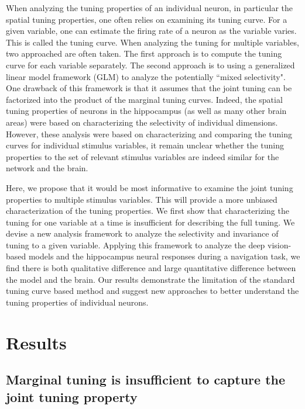 \documentclass[11pt]{article}
\begin{document}
When analyzing the tuning properties of an individual neuron, in particular the spatial tuning properties, one often relies on examining its tuning curve. For a given variable, one can estimate the firing rate of a neuron as the variable varies. This is called the tuning curve. When analyzing the tuning for multiple variables, two approached are often taken. The first approach is to compute the tuning curve for each variable separately. 
The second approach is to using a generalized linear model framework (GLM) to analyze the potentially ``mixed selectivity". One drawback of this framework is that it assumes that the joint tuning can be factorized into the product of the marginal tuning curves. Indeed, the spatial tuning properties of neurons in the hippocampus (as well as many other brain areas) were based on characterizing the selectivity of individual dimensions. However, these analysis were based on characterizing and comparing the tuning curves for individual stimulus variables, it remain unclear whether the tuning properties to the set of relevant stimulus variables are indeed similar for the network and the brain.


Here, we propose that it would be most informative to examine the joint tuning properties to multiple stimulus variables. This will provide a more unbiased characterization of the tuning properties. We first show that characterizing the tuning for one variable at a time is insufficient for describing the full tuning.
We devise a new analysis framework to analyze the selectivity and invariance of tuning to a given variable. Applying this framework to analyze the deep vision-based models and the hippocampus neural responses during a navigation task, we find there is both qualitative difference and large quantitative difference between the model and the brain. Our results demonstrate the limitation of the standard tuning curve based method and suggest new approaches to better understand the tuning properties of individual neurons.






\section{Results}

\subsection{Marginal tuning is insufficient to capture the joint tuning property}
\end{document}
